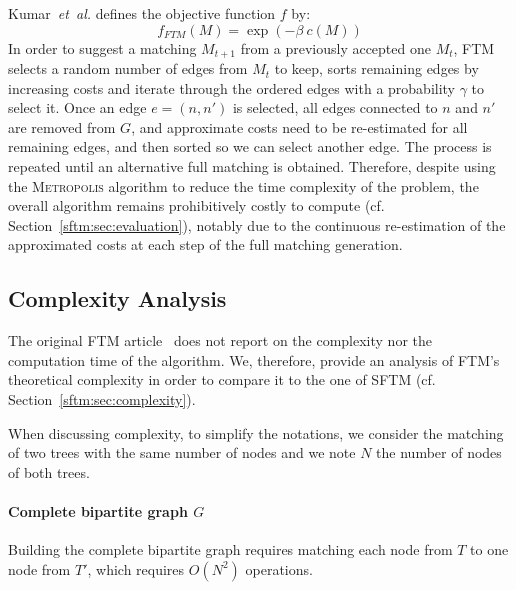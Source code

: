 Kumar~\emph{et~al.} defines the objective function $f$ by:
\begin{equation} \label{eq:objective_FTM}
	f_{FTM}(M) = \exp(-\beta\ c(M))
\end{equation}
In order to suggest a matching $M_{t+1}$ from a previously accepted one $M_t$, FTM selects a random number of edges from $M_t$ to keep, sorts remaining edges by increasing costs and iterate through the ordered edges with a probability $\gamma$ to select it.
Once an edge $e = (n,n')$ is selected, all edges connected to $n$ and $n'$ are removed from $G$, and approximate costs need to be re-estimated for all remaining edges, and then sorted so we can select another edge.
The process is repeated until an alternative full matching is obtained.
Therefore, despite using the \textsc{Metropolis} algorithm to reduce the time complexity of the problem, the overall algorithm remains prohibitively costly to compute (cf. Section~\ref{sftm:sec:evaluation}), notably due to the continuous re-estimation of the approximated costs at each step of the full matching generation.

\subsection{Complexity Analysis}\label{sftm:sec:ftm_complexity}
The original FTM article~\cite{Kumar2011_FTM} does not report on the complexity nor the computation time of the algorithm.
We, therefore, provide an analysis of FTM's theoretical complexity in order to compare it to the one of SFTM (cf. Section~\ref{sftm:sec:complexity}).

When discussing complexity, to simplify the notations, we consider the matching of two trees with the same number of nodes and we note $N$ the number of nodes of both trees.

\paragraph{Complete bipartite graph $G$}
Building the complete bipartite graph requires matching each node from $T$ to one node from $T'$, which requires $O(N^2)$ operations. 

